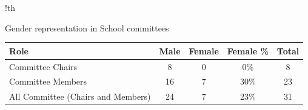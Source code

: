 

\begin{tabbox}[11cm]{!th}
\caption{Gender representation in School committees}
\label{tab:gender:committees}
\footnotesize   
\begin{tabular}{p{6cm} 
                !{\quad}
                S[table-format=2.0]
                !{\quad}
                S[table-format=2.0]
                !{\quad}
                S[table-format=2.0\%]
                !{\quad}
                S[table-format=2.0]
                }

\toprule 
Role & {Male} & {Female} & {Female \%} & {Total}\\
\midrule 
Committee Chairs & 8 & 0 & 0\% & 8\\
\hdashline
Committee Members & 16 & 7 & 30\% & 23 \\
\hdashline
All Committee (Chairs and Members) & 24 & 7 & 23\% &31\\
\bottomrule 
\end{tabular}


\end{tabbox}